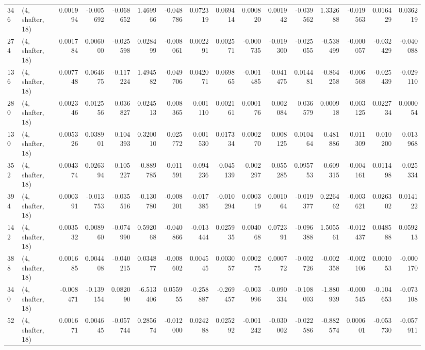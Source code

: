 \begin{tabular}{llrrrrrrrrrrrrrr}
346 &  (4, shafter, 18) &   0.001994 & -0.005692 & -0.068652 &    1.469966 & -0.048786 &   0.072319 &  0.069414 &  0.000820 &  0.001942 & -0.039562 &    1.332688 & -0.019563 &  0.016429 &  0.036219 \\
274 &  (4, shafter, 18) &   0.001784 &  0.006000 & -0.025598 &    0.028499 & -0.008061 &   0.002291 &  0.002571 & -0.000735 & -0.019300 & -0.025055 &   -0.538499 & -0.000057 & -0.032429 & -0.040088 \\
136 &  (4, shafter, 18) &   0.007748 &  0.064675 & -0.117224 &    1.494582 & -0.049706 &   0.042071 &  0.069865 & -0.001485 & -0.041475 &  0.014481 &   -0.864258 & -0.006568 & -0.025439 & -0.029110 \\
280 &  (4, shafter, 18) &   0.002346 &  0.012556 & -0.036827 &    0.024513 & -0.008365 &  -0.001110 &  0.002161 &  0.000176 & -0.002084 & -0.036579 &    0.000918 & -0.003125 &  0.022734 &  0.000054 \\
130 &  (4, shafter, 18) &   0.005326 &  0.038901 & -0.104393 &    0.320010 & -0.025772 &  -0.001530 &  0.017334 &  0.000270 & -0.008125 &  0.010464 &   -0.481886 & -0.011309 & -0.010200 & -0.013968 \\
352 &  (4, shafter, 18) &   0.004374 &  0.026394 & -0.105227 &   -0.889785 & -0.011591 &  -0.094236 & -0.045139 & -0.002297 & -0.055285 &  0.095753 &   -0.609315 & -0.004161 &  0.011498 & -0.025334 \\
394 &  (4, shafter, 18) &   0.000391 & -0.013753 & -0.035516 &   -0.130780 & -0.008201 &  -0.017385 & -0.010294 &  0.000319 &  0.001064 & -0.019377 &    0.226462 & -0.003621 &  0.026302 &  0.014122 \\
142 &  (4, shafter, 18) &   0.003532 &  0.008960 & -0.074990 &    0.592068 & -0.040866 &  -0.013444 &  0.025935 &  0.004068 &  0.072391 & -0.096388 &    1.505561 & -0.012437 &  0.048588 &  0.059213 \\
388 &  (4, shafter, 18) &   0.001685 &  0.004408 & -0.040215 &    0.034877 & -0.008602 &   0.004545 &  0.003057 &  0.000275 &  0.000772 & -0.002726 &   -0.002358 & -0.002106 &  0.001053 & -0.000170 \\
340 &  (4, shafter, 18) &  -0.008471 & -0.139154 &  0.082090 &   -6.513406 &  0.055955 &  -0.258887 & -0.269457 & -0.003996 & -0.090334 & -0.108003 &   -1.880939 & -0.000545 & -0.104653 & -0.073108 \\
52  &  (4, shafter, 18) &   0.001671 &  0.004645 & -0.057744 &    0.285674 & -0.012000 &   0.024288 &  0.025292 & -0.001242 & -0.030002 & -0.022586 &   -0.882574 &  0.000601 & -0.053730 & -0.057911 \\

\end{tabular}

